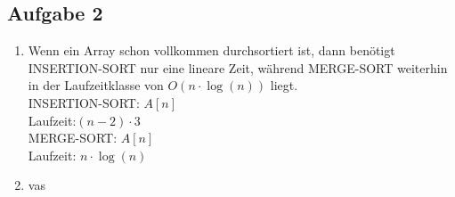 \documentclass[a4paper,fleqn]{scrartcl}
\begin{document}
\subsection*{Aufgabe 2}
\begin{enumerate}[1.]
\item
Wenn ein Array schon vollkommen durchsortiert ist, dann benötigt INSERTION-SORT nur eine lineare Zeit, während MERGE-SORT weiterhin in der Laufzeitklasse von $O\left(n \cdot \log(n)\right)$ liegt. \\
INSERTION-SORT: $A[n]$ \\
Laufzeit:$(n-2)\cdot 3$ \\
MERGE-SORT: $A[n]$ \\
Laufzeit: $n\cdot \log(n)$
\item vas 
\end{enumerate}
\end{document}
